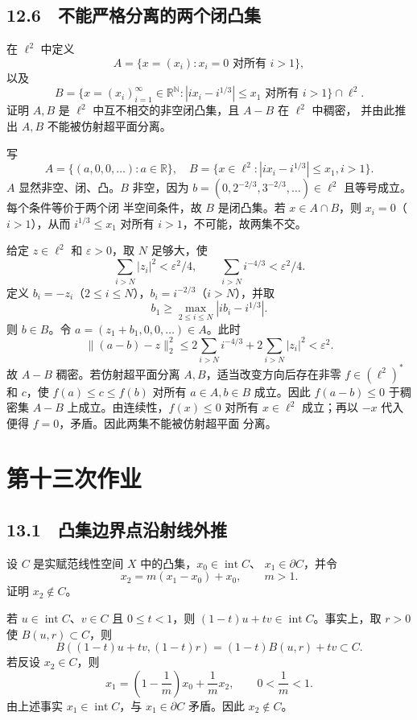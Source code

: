 \subsection*{12.6　不能严格分离的两个闭凸集}

\begin{problem}
在 $\ell^2$ 中定义
\[
 A=\{x=(x_i):x_i=0\text{ 对所有 }i>1\},
\]
以及
\[
 B=\{x=(x_i)_{i=1}^\infty\in\mathbb R^{\mathbb N}:
 |ix_i-i^{1/3}|\le x_1\text{ 对所有 }i>1\}\cap\ell^2.
\]
证明 $A,B$ 是 $\ell^2$ 中互不相交的非空闭凸集，且 $A-B$ 在 $\ell^2$ 中稠密，
并由此推出 $A,B$ 不能被仿射超平面分离。
\end{problem}

写
\[
 A=\{(a,0,0,\dots):a\in\mathbb R\},
\quad B=\{x\in\ell^2:|ix_i-i^{1/3}|\le x_1, i>1\}.
\]
$A$ 显然非空、闭、凸。$B$ 非空，因为
$b=(0,2^{-2/3},3^{-2/3},\dots)\in\ell^2$ 且等号成立。每个条件等价于两个闭
半空间条件，故 $B$ 是闭凸集。若 $x\in A\cap B$，则 $x_i=0$（$i>1$），从而
$i^{1/3}\le x_1$ 对所有 $i>1$，不可能，故两集不交。

给定 $z\in\ell^2$ 和 $\varepsilon>0$，取 $N$ 足够大，使
\[
 \sum_{i>N}|z_i|^2<\varepsilon^2/4,
 \qquad \sum_{i>N}i^{-4/3}<\varepsilon^2/4.
\]
定义 $b_i=-z_i$（$2\le i\le N$），$b_i=i^{-2/3}$（$i>N$），并取
\[
 b_1\ge\max_{2\le i\le N}|ib_i-i^{1/3}|.
\]
则 $b\in B$。令 $a=(z_1+b_1,0,0,\dots)\in A$。此时
\[
 \|(a-b)-z\|_2^2
 \le2\sum_{i>N}i^{-4/3}+2\sum_{i>N}|z_i|^2<\varepsilon^2.
\]
故 $A-B$ 稠密。若仿射超平面分离 $A,B$，适当改变方向后存在非零
$f\in(\ell^2)^*$ 和 $c$，使 $f(a)\le c\le f(b)$ 对所有 $a\in A,b\in B$
成立。因此 $f(a-b)\le0$ 于稠密集 $A-B$ 上成立。由连续性，$f(x)\le0$ 对所有
$x\in\ell^2$ 成立；再以 $-x$ 代入便得 $f=0$，矛盾。因此两集不能被仿射超平面
分离。

\section{第十三次作业}

\subsection*{13.1　凸集边界点沿射线外推}

\begin{problem}
设 $C$ 是实赋范线性空间 $X$ 中的凸集，$x_0\in\operatorname{int}C$、
$x_1\in\partial C$，并令
\[
 x_2=m(x_1-x_0)+x_0,\qquad m>1.
\]
证明 $x_2\notin C$。
\end{problem}

若 $u\in\operatorname{int}C$、$v\in C$ 且 $0\le t<1$，则
$(1-t)u+tv\in\operatorname{int}C$。事实上，取 $r>0$ 使 $B(u,r)\subset C$，则
\[
 B((1-t)u+tv,(1-t)r)=(1-t)B(u,r)+tv\subset C.
\]
若反设 $x_2\in C$，则
\[
 x_1=\left(1-\frac1m\right)x_0+\frac1m x_2,\qquad 0<\frac1m<1.
\]
由上述事实 $x_1\in\operatorname{int}C$，与 $x_1\in\partial C$ 矛盾。因此
$x_2\notin C$。

